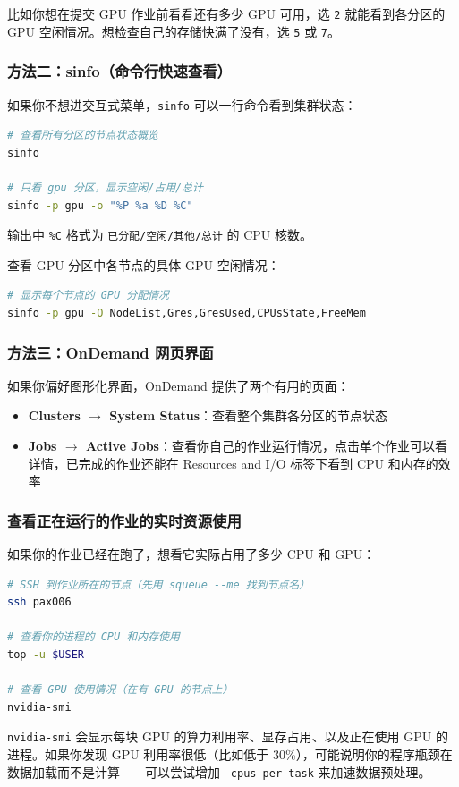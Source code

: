 比如你想在提交 GPU 作业前看看还有多少 GPU 可用，选 \texttt{2} 就能看到各分区的 GPU 空闲情况。想检查自己的存储快满了没有，选 \texttt{5} 或 \texttt{7}。

\subsubsection{方法二：sinfo（命令行快速查看）}

如果你不想进交互式菜单，\texttt{sinfo} 可以一行命令看到集群状态：

\begin{lstlisting}[language=bash]
# 查看所有分区的节点状态概览
sinfo

# 只看 gpu 分区，显示空闲/占用/总计
sinfo -p gpu -o "%P %a %D %C"
\end{lstlisting}

输出中 \texttt{\%C} 格式为 \texttt{已分配/空闲/其他/总计} 的 CPU 核数。

查看 GPU 分区中各节点的具体 GPU 空闲情况：

\begin{lstlisting}[language=bash]
# 显示每个节点的 GPU 分配情况
sinfo -p gpu -O NodeList,Gres,GresUsed,CPUsState,FreeMem
\end{lstlisting}

\subsubsection{方法三：OnDemand 网页界面}

如果你偏好图形化界面，OnDemand 提供了两个有用的页面：

\begin{itemize}[nosep]
  \item \textbf{Clusters $\rightarrow$ System Status}：查看整个集群各分区的节点状态
  \item \textbf{Jobs $\rightarrow$ Active Jobs}：查看你自己的作业运行情况，点击单个作业可以看详情，已完成的作业还能在 Resources and I/O 标签下看到 CPU 和内存的效率
\end{itemize}

\subsubsection{查看正在运行的作业的实时资源使用}

如果你的作业已经在跑了，想看它实际占用了多少 CPU 和 GPU：

\begin{lstlisting}[language=bash]
# SSH 到作业所在的节点（先用 squeue --me 找到节点名）
ssh pax006

# 查看你的进程的 CPU 和内存使用
top -u $USER

# 查看 GPU 使用情况（在有 GPU 的节点上）
nvidia-smi
\end{lstlisting}

\texttt{nvidia-smi} 会显示每块 GPU 的算力利用率、显存占用、以及正在使用 GPU 的进程。如果你发现 GPU 利用率很低（比如低于 30\%），可能说明你的程序瓶颈在数据加载而不是计算——可以尝试增加 \texttt{--cpus-per-task} 来加速数据预处理。
